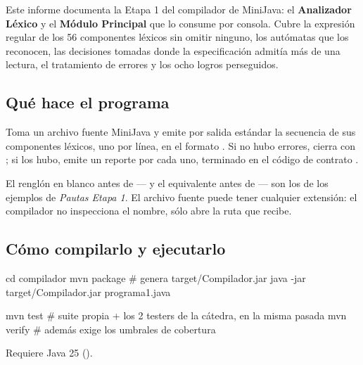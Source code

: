 \documentclass[11pt,a4paper]{article}
\begin{document}
Este informe documenta la Etapa 1 del compilador de MiniJava: el \textbf{Analizador Léxico} y el
\textbf{Módulo Principal} que lo consume por consola. Cubre la expresión regular de los 56
componentes léxicos sin omitir ninguno, los autómatas que los reconocen, las decisiones tomadas
donde la especificación admitía más de una lectura, el tratamiento de errores y los ocho logros
perseguidos.

\subsection{Qué hace el programa}

Toma un archivo fuente MiniJava y emite por salida estándar la secuencia de sus componentes léxicos,
uno por línea, en el formato . Si no hubo errores, cierra con
\lex{[SinErrores]}; si los hubo, emite un reporte por cada uno, terminado en el código de contrato
.

\begin{codigoLlano}
$ java -jar Compilador.jar programa1.java
(litString,"hola",1)
(idMV,v1,2)
(op+,+,2)
(idMV,chau,2)
(pr_if,if,3)
(pr_class,class,3)
(llaveC,},3)
(EOF,$,3)

[SinErrores]
\end{codigoLlano}

El renglón en blanco antes de \lex{[SinErrores]} --- y el equivalente antes de
 --- son los de los ejemplos de \emph{Pautas Etapa 1}. El archivo fuente puede
tener cualquier extensión: el compilador no inspecciona el nombre, sólo abre la ruta que recibe.

\subsection{Cómo compilarlo y ejecutarlo}

\begin{codigoLlano}
cd compilador
mvn package                                   # genera target/Compilador.jar
java -jar target/Compilador.jar programa1.java

mvn test        # suite propia + los 2 testers de la cátedra, en la misma pasada
mvn verify      # además exige los umbrales de cobertura
\end{codigoLlano}

Requiere Java 25 ().

\end{document}
